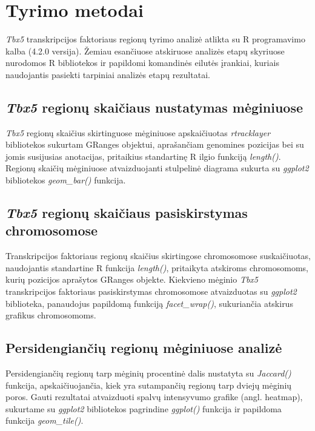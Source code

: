 \documentclass[12pt]{article}
\begin{document}

\section{Tyrimo metodai}
\emph{Tbx5} transkripcijos faktoriaus regionų tyrimo analizė atlikta
su R programavimo kalba (4.2.0 versija). Žemiau esančiuose atskiruose
analizės etapų skyriuose nurodomos R bibliotekos ir papildomi komandinės
eilutės įrankiai, kuriais naudojantis pasiekti tarpiniai analizės etapų
rezultatai.

\subsection{\emph{Tbx5} regionų skaičiaus nustatymas mėginiuose}
\emph{Tbx5} regionų skaičius skirtinguose mėginiuose apskaičiuotas
\emph{rtracklayer} bibliotekos sukurtam GRanges objektui, aprašančiam
genomines pozicijas bei su jomis susijusias anotacijas, pritaikius
standartinę R ilgio funkciją \emph{length()}.
Regionų skaičių mėginiuose atvaizduojanti stulpelinė diagrama sukurta
su \emph{ggplot2} bibliotekos \emph{geom\_bar()} funkcija.

\subsection{\emph{Tbx5} regionų skaičiaus pasiskirstymas chromosomose}
Transkripcijos faktoriaus regionų skaičius skirtingose chromosomose
suskaičiuotas, naudojantis standartine R funkcija \emph{length()},
pritaikyta atskiroms chromosomoms, kurių pozicijos aprašytos GRanges
objekte.
Kiekvieno mėginio \emph{Tbx5} transkripcijos faktoriaus pasiskirstymas
chromosomose atvaizduotas su \emph{ggplot2} biblioteka, panaudojus
papildomą funkciją \emph{facet\_wrap()}, sukuriančia atskirus 
grafikus chromosomoms.

\subsection{Persidengiančių regionų mėginiuose analizė}
Persidengiančių regionų tarp mėginių procentinė dalis nustatyta
su \emph{Jaccard()} funkcija, apskaičiuojančia, kiek yra sutampančių
regionų tarp dviejų mėginių poros.
Gauti rezultatai atvaizduoti spalvų intensyvumo grafike (angl.
heatmap), sukurtame su \emph{ggplot2} bibliotekos pagrindine \emph{ggplot()}
funkcija ir papildoma funkcija \emph{geom\_tile()}.
\end{document}
